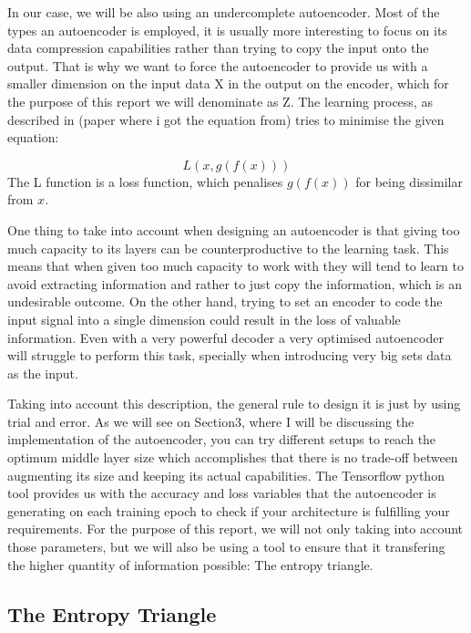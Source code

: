 In our case, we will be also using an undercomplete autoencoder. Most of the types an autoencoder is employed, it is usually more interesting to focus on its data compression capabilities rather than trying to copy the input onto the output. That is why we want to force the autoencoder to provide us with a smaller dimension on the input data X in the output on the encoder, which for the purpose of this report we will denominate as Z. The learning process, as described in (paper where i got the equation from) tries to minimise the given equation: \par

\begin{equation}\label{eq:artificial neuron}
L(x,g(f(x)))
\end{equation}
The L function is a loss function, which penalises $g(f(x))$ for being dissimilar from $x$.

One thing to take into account when designing an autoencoder is that giving too much capacity to its layers can be counterproductive to the learning task. This means that when given too much capacity to work with they will tend to learn to avoid extracting information and rather to just copy the information, which is an undesirable outcome. On the other hand, trying to set an encoder to code the input signal into a single dimension could result in the loss of valuable information. Even with a very powerful decoder a very optimised autoencoder will struggle to perform this task, specially when introducing very big sets data as the input. \par

Taking into account this description, the general rule to design it is just by using trial and error. As we will see on Section3, where I will be discussing the implementation of the autoencoder, you can try different setups to reach the optimum middle layer size which accomplishes that there is no trade-off between augmenting its size and keeping its actual capabilities. The Tensorflow python tool provides us with the accuracy and loss variables that the autoencoder is generating on each training epoch to check if your architecture is fulfilling your requirements. For the purpose of this report, we will not only taking into account those parameters, but we will also be using a tool to ensure that it transfering the higher quantity of information possible: The entropy triangle.

\subsection{The Entropy Triangle}
